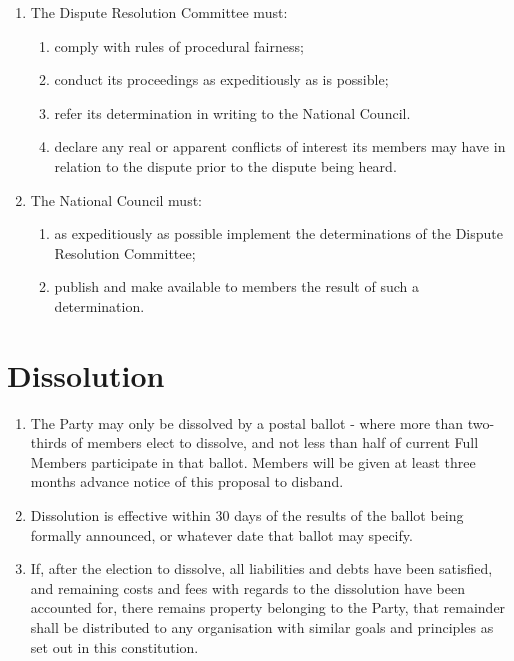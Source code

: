 \documentclass[a4paper,titlepage,8.5pt]{article}
\begin{document}
\begin{enumerate}
\begin{enumerate}
\end{enumerate}
\item The Dispute Resolution Committee must:
\begin{enumerate}
\item comply with rules of procedural fairness;
\item conduct its proceedings as expeditiously as is possible;
\item refer its determination in writing to the National Council.
\item declare any real or apparent conflicts of interest its members may have in relation to the dispute prior to the dispute being heard.
\end{enumerate}
\item The National Council must:
\begin{enumerate}
\item as expeditiously as possible implement the determinations of the Dispute Resolution Committee;
\item publish and make available to members the result of such a determination.
\end{enumerate}
\end{enumerate}

\section{Dissolution}

\begin{enumerate}
\item The Party may only be dissolved by a postal ballot - where more than two-thirds of members elect to dissolve, and not less than half of current Full Members participate in that ballot. Members will be given at least three months advance notice of this proposal to disband.
\item Dissolution is effective within 30 days of the results of the ballot being formally announced, or whatever date that ballot may specify.
\item If, after the election to dissolve, all liabilities and debts have been satisfied, and remaining costs and fees with regards to the dissolution have been accounted for, there remains property belonging to the Party, that remainder shall be distributed to any organisation with similar goals and principles as set out in this constitution.
\end{enumerate}
\end{document}
